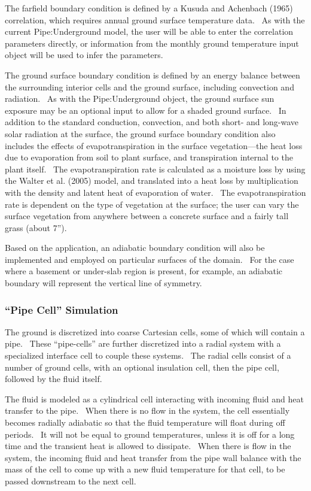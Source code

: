 The farfield boundary condition is defined by a Kusuda and Achenbach (1965) correlation, which requires annual ground surface temperature data.~ As with the current Pipe:Underground model, the user will be able to enter the correlation parameters directly, or information from the monthly ground temperature input object will be used to infer the parameters.

The ground surface boundary condition is defined by an energy balance between the surrounding interior cells and the ground surface, including convection and radiation.~ As with the Pipe:Underground object, the ground surface sun exposure may be an optional input to allow for a shaded ground surface.~ In addition to the standard conduction, convection, and both short- and long-wave solar radiation at the surface, the ground surface boundary condition also includes the effects of evapotranspiration in the surface vegetation---the heat loss due to evaporation from soil to plant surface, and transpiration internal to the plant itself.~ The evapotranspiration rate is calculated as a moisture loss by using the Walter et al. (2005) model, and translated into a heat loss by multiplication with the density and latent heat of evaporation of water.~ The evapotranspiration rate is dependent on the type of vegetation at the surface; the user can vary the surface vegetation from anywhere between a concrete surface and a fairly tall grass (about 7'').

Based on the application, an adiabatic boundary condition will also be implemented and employed on particular surfaces of the domain.~ For the case where a basement or under-slab region is present, for example, an adiabatic boundary will represent the vertical line of symmetry.

\subsubsection{\texorpdfstring{``Pipe Cell'' Simulation}{Pipe Cell Simulation}}\label{pipe-cell-simulation}

The ground is discretized into coarse Cartesian cells, some of which will contain a pipe.~ These ``pipe-cells'' are further discretized into a radial system with a specialized interface cell to couple these systems.~ The radial cells consist of a number of ground cells, with an optional insulation cell, then the pipe cell, followed by the fluid itself.

The fluid is modeled as a cylindrical cell interacting with incoming fluid and heat transfer to the pipe.~ When there is no flow in the system, the cell essentially becomes radially adiabatic so that the fluid temperature will float during off periods.~ It will not be equal to ground temperatures, unless it is off for a long time and the transient heat is allowed to dissipate.~ When there is flow in the system, the incoming fluid and heat transfer from the pipe wall balance with the mass of the cell to come up with a new fluid temperature for that cell, to be passed downstream to the next cell.

